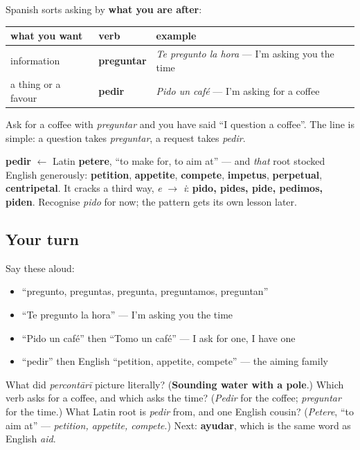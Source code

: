 \begin{grammarlens}[title={Grammar Lens: one English \textquotedblleft{}ask\textquotedblright{}, two Spanish verbs}]
Spanish sorts asking by \textbf{what you are after}:

\noindent
\begin{tabularx}{\linewidth}{@{}>{\raggedright\arraybackslash}X>{\raggedright\arraybackslash}X>{\raggedright\arraybackslash}X@{}}
\toprule
\textbf{what you want} & \textbf{verb} & \textbf{example} \\
\midrule
information & \textbf{preguntar} & \emph{Te pregunto la hora} — I'm asking you the time \\
a thing or a favour & \textbf{pedir} & \emph{Pido un café} — I'm asking for a coffee \\
\bottomrule
\end{tabularx}

Ask for a coffee with \emph{preguntar} and you have said \textquotedblleft{}I question a coffee\textquotedblright{}. The line is simple: a question takes \emph{preguntar}, a request takes \emph{pedir}.

\textbf{pedir} $\leftarrow$ Latin \textbf{petere}, \textquotedblleft{}to make for, to aim at\textquotedblright{} — and \emph{that} root stocked English generously: \textbf{petition}, \textbf{appetite}, \textbf{compete}, \textbf{impetus}, \textbf{perpetual}, \textbf{centripetal}. It cracks a third way, \emph{e} $\to$ \emph{i}: \textbf{pido, pides, pide, pedimos, piden}. Recognise \emph{pido} for now; the pattern gets its own lesson later.
\end{grammarlens}

\subsection*{Your turn}
Say these aloud:

\begin{itemize}
\raggedright
  \item \textquotedblleft{}pregunto, preguntas, pregunta, preguntamos, preguntan\textquotedblright{}
  \item \textquotedblleft{}Te pregunto la hora\textquotedblright{} — I'm asking you the time
  \item \textquotedblleft{}Pido un café\textquotedblright{} then \textquotedblleft{}Tomo un café\textquotedblright{} — I ask for one, I have one
  \item \textquotedblleft{}pedir\textquotedblright{} then English \textquotedblleft{}petition, appetite, compete\textquotedblright{} — the aiming family
\end{itemize}

\begin{tcolorbox}[breakable,colback=teal!4,colframe=teal!35!black,title={Before you move on}]
What did \emph{percontārī} picture literally? (\textbf{Sounding water with a pole}.) Which verb asks for a coffee, and which asks the time? (\emph{Pedir} for the coffee; \emph{preguntar} for the time.) What Latin root is \emph{pedir} from, and one English cousin? (\emph{Petere}, \textquotedblleft{}to aim at\textquotedblright{} — \emph{petition, appetite, compete}.) Next: \textbf{ayudar}, which is the same word as English \emph{aid}.
\end{tcolorbox}
